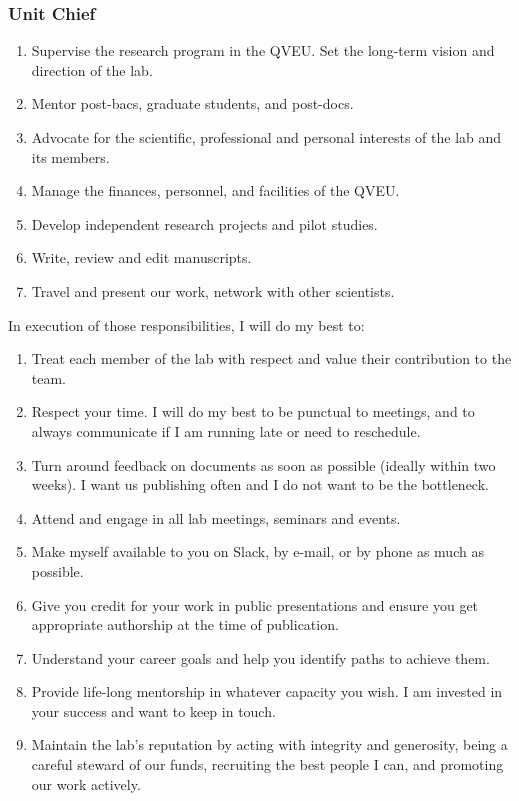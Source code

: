 \documentclass[10pt, letterpaper, twocolumn]{article} %
\begin{document}
\subsubsection{Unit Chief}
\begin{enumerate}
\item Supervise the research program in the QVEU. Set the long-term vision and direction of the lab.
\item Mentor post-bacs, graduate students, and post-docs.
\item Advocate for the scientific, professional and personal interests of the lab and its members.
\item Manage the finances, personnel, and facilities of the QVEU.
\item Develop independent research projects and pilot studies.
\item Write, review and edit manuscripts.
\item Travel and present our work, network with other scientists.
\end{enumerate}
In execution of those responsibilities, I will do my best to:
\begin{enumerate}
\item Treat each member of the lab with respect and value their contribution to the team.
\item Respect your time. I will do my best to be punctual to meetings, and to always communicate if I am running late or need to reschedule.
\item Turn around feedback on documents as soon as possible (ideally within two weeks). I want us publishing often and I do not want to be the bottleneck.
\item Attend and engage in all lab meetings, seminars and events.
\item Make myself available to you on Slack, by e-mail, or by phone as much as possible.
\item Give you credit for your work in public presentations and ensure you get appropriate authorship at the time of publication.
\item Understand your career goals and help you identify paths to achieve them.
\item Provide life-long mentorship in whatever capacity you wish. I am invested in your success and want to keep in touch.
\item Maintain the lab's reputation by acting with integrity and generosity, being a careful steward of our funds, recruiting the best people I can, and promoting our work actively.
\end{enumerate}
\end{document}
